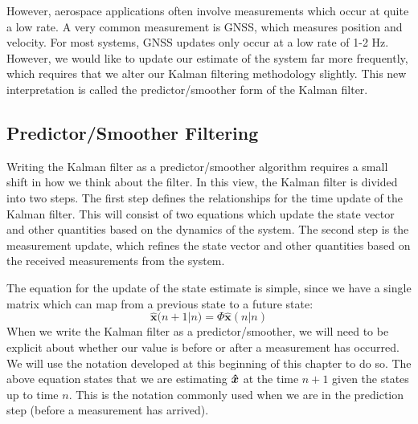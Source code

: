 However, aerospace applications often involve measurements which occur at quite a low rate. A very common measurement is GNSS, which measures position and velocity. For most systems, GNSS updates only occur at a low rate of 1-2 Hz. However, we would like to update our estimate of the system far more frequently, which requires that we alter our Kalman filtering methodology slightly. This new interpretation is called the predictor/smoother form of the Kalman filter.

\subsection{Predictor/Smoother Filtering}

Writing the Kalman filter as a predictor/smoother algorithm requires a small shift in how we think about the filter. In this view, the Kalman filter is divided into two steps. The first step defines the relationships for the time update of the Kalman filter. This will consist of two equations which update the state vector and other quantities based on the dynamics of the system. The second step is the measurement update, which refines the state vector and other quantities based on the received measurements from the system.

The equation for the update of the state estimate is simple, since we have a single matrix which can map from a previous state to a future state:
$$\bm{\hat{x}}({n+1|n)}=\Phi\bm{\hat{x}}(n|n)$$
When we write the Kalman filter as a predictor/smoother, we will need to be explicit about whether our value is before or after a measurement has occurred. We will use the notation developed at this beginning of this chapter to do so. The above equation states that we are estimating $\bm{\hat{x}}$ at the time $n+1$ given the states up to time $n$. This is the notation commonly used when we are in the prediction step (before a measurement has arrived).

